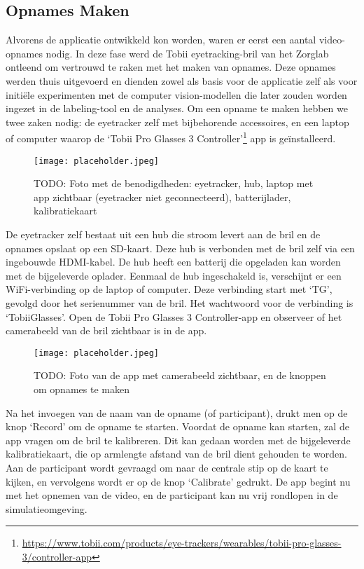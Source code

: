 \subsection{Opnames Maken}

Alvorens de applicatie ontwikkeld kon worden, waren er eerst een aantal video-opnames nodig. 
In deze fase werd de Tobii eyetracking-bril van het Zorglab ontleend om vertrouwd te raken met het maken van opnames. 
Deze opnames werden thuis uitgevoerd en dienden zowel als basis voor de applicatie zelf als voor initiële experimenten met de computer vision-modellen die later zouden worden ingezet in de labeling-tool en de analyses.
Om een opname te maken hebben we twee zaken nodig: de eyetracker zelf met bijbehorende accessoires, en een laptop of computer waarop de `Tobii Pro Glasses 3 Controller'\footnote{\url{https://www.tobii.com/products/eye-trackers/wearables/tobii-pro-glasses-3/controller-app}} app is geïnstalleerd.

\begin{figure}[H]
  \centering
  \texttt{[image: placeholder.jpeg]}
  \caption[]{\label{fig:todo} TODO: Foto met de benodigdheden: eyetracker, hub, laptop met app zichtbaar (eyetracker niet geconnecteerd), batterijlader, kalibratiekaart
 }
\end{figure}

De eyetracker zelf bestaat uit een hub die stroom levert aan de bril en de opnames opslaat op een SD-kaart. 
Deze hub is verbonden met de bril zelf via een ingebouwde HDMI-kabel.
De hub heeft een batterij die opgeladen kan worden met de bijgeleverde oplader. 
Eenmaal de hub ingeschakeld is, verschijnt er een WiFi-verbinding op de laptop of computer.
Deze verbinding start met `TG', gevolgd door het serienummer van de bril. Het wachtwoord voor de verbinding is `TobiiGlasses'. 
Open de Tobii Pro Glasses 3 Controller-app en observeer of het camerabeeld van de bril zichtbaar is in de app.

\begin{figure}[H]
  \centering
  \texttt{[image: placeholder.jpeg]}
  \caption[]{\label{fig:todo} TODO: Foto van de app met camerabeeld zichtbaar, en de knoppen om opnames te maken
 }
\end{figure}

Na het invoegen van de naam van de opname (of participant), drukt men op de knop `Record' om de opname te starten.
Voordat de opname kan starten, zal de app vragen om de bril te kalibreren. 
Dit kan gedaan worden met de bijgeleverde kalibratiekaart, die op armlengte afstand van de bril dient gehouden te worden.
Aan de participant wordt gevraagd om naar de centrale stip op de kaart te kijken, en vervolgens wordt er op de knop `Calibrate' gedrukt.
De app begint nu met het opnemen van de video, en de participant kan nu vrij rondlopen in de simulatieomgeving.

